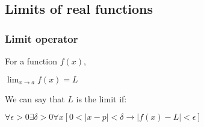 
\subsection{Limits of real functions}

\subsubsection{Limit operator}

For a function \(f(x)\),

\(\lim_{x\rightarrow a}f(x)=L\)

We can say that \(L\) is the limit if:

\(\forall \epsilon >0 \exists \delta >0 \forall x[0<|x-p|<\delta \rightarrow |f(x)-L|<\epsilon]\)



